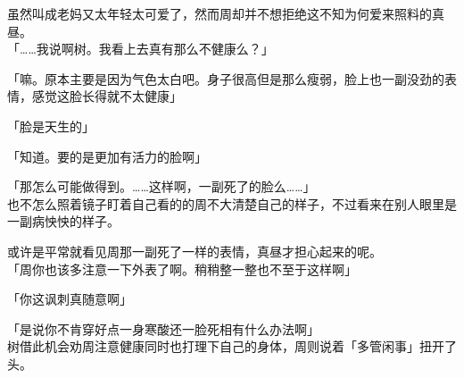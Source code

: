 虽然叫成老妈又太年轻太可爱了，然而周却并不想拒绝这不知为何爱来照料的真昼。\\

「……我说啊树。我看上去真有那么不健康么？」

「嘛。原本主要是因为气色太白吧。身子很高但是那么瘦弱，脸上也一副没劲的表情，感觉这脸长得就不太健康」

「脸是天生的」

「知道。要的是更加有活力的脸啊」

「那怎么可能做得到。……这样啊，一副死了的脸么……」\\

也不怎么照着镜子盯着自己看的的周不大清楚自己的样子，不过看来在别人眼里是一副病怏怏的样子。

或许是平常就看见周那一副死了一样的表情，真昼才担心起来的呢。\\

「周你也该多注意一下外表了啊。稍稍整一整也不至于这样啊」

「你这讽刺真随意啊」

「是说你不肯穿好点一身寒酸还一脸死相有什么办法啊」\\

树借此机会劝周注意健康同时也打理下自己的身体，周则说着「多管闲事」扭开了头。

